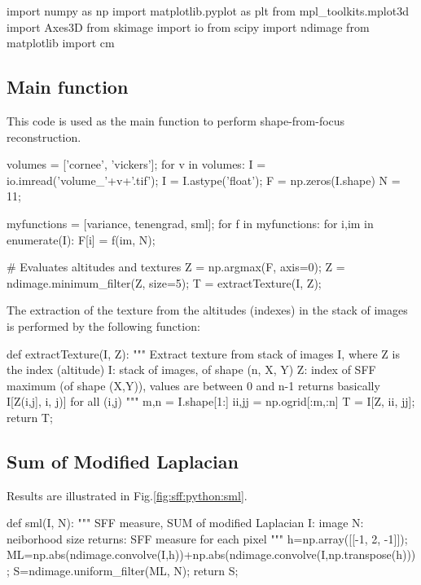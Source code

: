 \def\QRCODE{MASTER_mispa_TUT.IMG.shape_from_focus_pythonqrcode.png}
\def\QRPAGE{http://www.iptutorials.science/tree/master/MASTER_mispa/TUT.IMG.shape_from_focus/python}

\begin{python}
import numpy as np
import matplotlib.pyplot as plt
from mpl_toolkits.mplot3d import Axes3D
from skimage import io
from scipy import ndimage
from matplotlib import cm
\end{python}

\subsection{Main function}
This code is used as the main function to perform shape-from-focus reconstruction. 

\begin{python}
volumes = ['cornee', 'vickers'];
for v in volumes:
    I = io.imread('volume_'+v+'.tif');
    I = I.astype('float');
    F = np.zeros(I.shape)
    N = 11;
    
    myfunctions = [variance, tenengrad, sml];
    for f in myfunctions:
        for i,im in enumerate(I):
            F[i] = f(im, N);
            
        # Evaluates altitudes and textures
        Z = np.argmax(F, axis=0);
        Z = ndimage.minimum_filter(Z, size=5);
        T = extractTexture(I, Z);
\end{python}

The extraction of the texture from the altitudes (indexes) in the stack of images is performed by the following function:
\begin{python}
def extractTexture(I, Z):
    """
    Extract texture from stack of images I, where Z is the index (altitude)
    I: stack of images, of shape (n, X, Y)
    Z: index of SFF maximum (of shape (X,Y)), values are between 0 and n-1
    returns basically I[Z(i,j], i, j)] for all (i,j)
    """
    m,n = I.shape[1:]
    ii,jj = np.ogrid[:m,:n]
    T = I[Z, ii, jj];
    return T;
\end{python}


\subsection{Sum of Modified Laplacian}
Results are illustrated in Fig.\ref{fig:sff:python:sml}.

\begin{python}
def sml(I, N):
    """
    SFF measure, SUM of modified Laplacian
    I: image
    N: neiborhood size
    returns: SFF measure for each pixel
    """
    h=np.array([[-1, 2, -1]]);
    ML=np.abs(ndimage.convolve(I,h))+np.abs(ndimage.convolve(I,np.transpose(h)));
    S=ndimage.uniform_filter(ML, N);
    return S;
\end{python}

